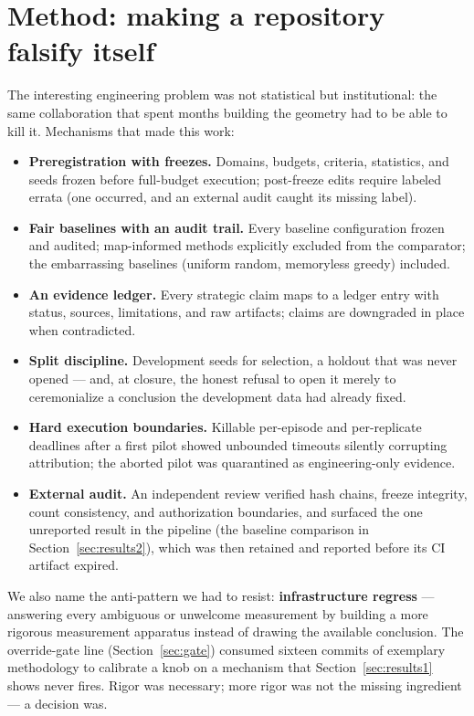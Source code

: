 \documentclass[11pt]{article}
\begin{document}
\section{Method: making a repository falsify itself}\label{sec:method}

The interesting engineering problem was not statistical but institutional:
the same collaboration that spent months building the geometry had to be
able to kill it. Mechanisms that made this work:

\begin{itemize}
  \item \textbf{Preregistration with freezes.} Domains, budgets, criteria,
    statistics, and seeds frozen before full-budget execution; post-freeze
    edits require labeled errata (one occurred, and an external audit caught
    its missing label).
  \item \textbf{Fair baselines with an audit trail.} Every baseline
    configuration frozen and audited; map-informed methods explicitly
    excluded from the comparator; the embarrassing baselines (uniform
    random, memoryless greedy) included.
  \item \textbf{An evidence ledger.} Every strategic claim maps to a ledger
    entry with status, sources, limitations, and raw artifacts; claims are
    downgraded in place when contradicted.
  \item \textbf{Split discipline.} Development seeds for selection, a
    holdout that was never opened --- and, at closure, the honest refusal to
    open it merely to ceremonialize a conclusion the development data had
    already fixed.
  \item \textbf{Hard execution boundaries.} Killable per-episode and
    per-replicate deadlines after a first pilot showed unbounded timeouts
    silently corrupting attribution; the aborted pilot was quarantined as
    engineering-only evidence.
  \item \textbf{External audit.} An independent review verified hash chains,
    freeze integrity, count consistency, and authorization boundaries, and
    surfaced the one unreported result in the pipeline (the baseline
    comparison in Section~\ref{sec:results2}), which was then retained and
    reported before its CI artifact expired.
\end{itemize}

We also name the anti-pattern we had to resist: \textbf{infrastructure
regress} --- answering every ambiguous or unwelcome measurement by building
a more rigorous measurement apparatus instead of drawing the available
conclusion. The override-gate line (Section~\ref{sec:gate}) consumed sixteen
commits of exemplary methodology to calibrate a knob on a mechanism that
Section~\ref{sec:results1} shows never fires. Rigor was necessary; more
rigor was not the missing ingredient --- a decision was.
\end{document}
